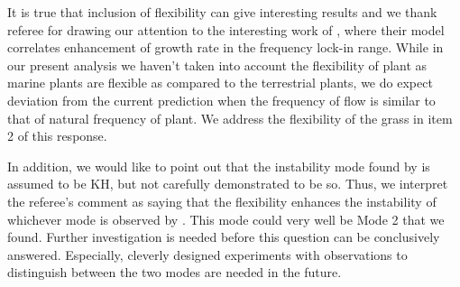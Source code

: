 \documentclass[letterpaper,10pt]{article}
\begin{document}
\begin{enumerate}
It is true that inclusion of flexibility can give interesting results and we thank referee for drawing our attention to the interesting work of \cite{Gosselin2009}, where their model correlates enhancement of growth rate in the frequency lock-in range. 
While in our present analysis we haven't taken into account the flexibility of plant as marine plants are flexible as compared to the terrestrial plants, we do expect deviation from the current prediction when the frequency of flow is similar to that of natural frequency of plant.  
We address the flexibility of the grass in item 2 of this response.

In addition, we would like to point out that the instability mode found by \cite{Gosselin2009} is assumed to be KH, but not carefully demonstrated to be so.
Thus, we interpret the referee's comment as saying that the flexibility enhances the instability of whichever mode is observed by \cite{Gosselin2009}. 
This mode could very well be Mode 2 that we found. 
Further investigation is needed before this question can be conclusively answered.
Especially, cleverly designed experiments with observations to distinguish between the two modes are needed in the future.

\end{enumerate}
\end{document}
